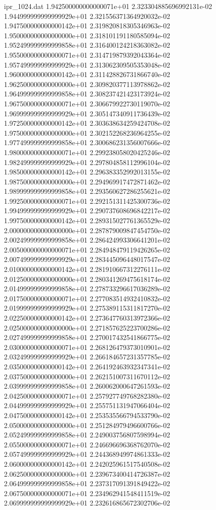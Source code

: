 \begin{filecontents}{ipr_1024.dat}
1.942500000000000071e+01 2.323304885696992131e-02
1.944999999999999929e+01 2.321556371364920032e-02
1.947500000000000142e+01 2.319820818305346963e-02
1.950000000000000000e+01 2.318101191180585094e-02
1.952499999999999858e+01 2.316400124218363082e-02
1.955000000000000071e+01 2.314719879392043364e-02
1.957499999999999929e+01 2.313062309505353048e-02
1.960000000000000142e+01 2.311428826731866740e-02
1.962500000000000000e+01 2.309820377113978862e-02
1.964999999999999858e+01 2.308237421423173924e-02
1.967500000000000071e+01 2.306679922730119070e-02
1.969999999999999929e+01 2.305147340911736439e-02
1.972500000000000142e+01 2.303638634259424708e-02
1.975000000000000000e+01 2.302152268236964255e-02
1.977499999999999858e+01 2.300686231356007666e-02
1.980000000000000071e+01 2.299238058020425246e-02
1.982499999999999929e+01 2.297804858112996104e-02
1.985000000000000142e+01 2.296383352992013155e-02
1.987500000000000000e+01 2.294969917472871462e-02
1.989999999999999858e+01 2.293560627286255621e-02
1.992500000000000071e+01 2.292151311425300736e-02
1.994999999999999929e+01 2.290737608696842217e-02
1.997500000000000142e+01 2.289315027761365529e-02
2.000000000000000000e+01 2.287879009847454750e-02
2.002499999999999858e+01 2.286424993306641201e-02
2.005000000000000071e+01 2.284948479119426265e-02
2.007499999999999929e+01 2.283445096448017547e-02
2.010000000000000142e+01 2.281910667312276111e-02
2.012500000000000000e+01 2.280341269475618174e-02
2.014999999999999858e+01 2.278733296617036289e-02
2.017500000000000071e+01 2.277083514932410832e-02
2.019999999999999929e+01 2.275389115311817270e-02
2.022500000000000142e+01 2.273647760313972366e-02
2.025000000000000000e+01 2.271857625223700286e-02
2.027499999999999858e+01 2.270017432541866775e-02
2.030000000000000071e+01 2.268126479373010901e-02
2.032499999999999929e+01 2.266184657231357785e-02
2.035000000000000142e+01 2.264192463932347341e-02
2.037500000000000000e+01 2.262151007311670112e-02
2.039999999999999858e+01 2.260062000647261593e-02
2.042500000000000071e+01 2.257927749768282380e-02
2.044999999999999929e+01 2.255751131947066404e-02
2.047500000000000142e+01 2.253535566794533790e-02
2.050000000000000000e+01 2.251284979496600766e-02
2.052499999999999858e+01 2.249003756807598994e-02
2.055000000000000071e+01 2.246696696368762070e-02
2.057499999999999929e+01 2.244368949974861333e-02
2.060000000000000142e+01 2.242025961517540508e-02
2.062500000000000000e+01 2.239673400414726387e-02
2.064999999999999858e+01 2.237317091391849422e-02
2.067500000000000071e+01 2.234962941548411519e-02
2.069999999999999929e+01 2.232616865672302706e-02

\end{filecontents}
